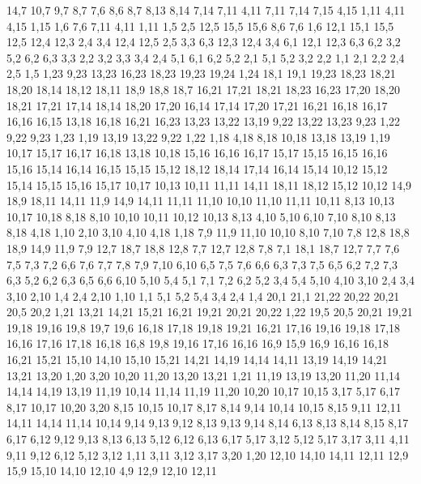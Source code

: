 14,7
10,7
9,7
8,7
%
7,6
8,6
8,7
8,13
8,14
7,14
7,11
%
4,11
7,11
7,14
7,15
4,15
%
1,11
4,11
4,15
1,15
%
1,6
7,6
7,11
4,11
1,11
%
1,5
2,5
12,5
15,5
15,6
8,6
7,6
1,6
%
12,1
15,1
15,5
12,5
12,4
12,3
%
2,4
3,4
12,4
12,5
2,5
%
3,3
6,3
12,3
12,4
3,4
%
6,1
12,1
12,3
6,3
6,2
%
3,2
5,2
6,2
6,3
3,3
%
2,2
3,2
3,3
3,4
2,4
%
5,1
6,1
6,2
5,2
%
2,1
5,1
5,2
3,2
2,2
%
1,1
2,1
2,2
2,4
2,5
1,5
1,23
9,23
13,23
16,23
18,23
19,23
19,24
1,24
%
18,1
19,1
19,23
18,23
18,21
18,20
18,14
18,12
18,11
18,9
18,8
18,7
%
16,21
17,21
18,21
18,23
16,23
%
17,20
18,20
18,21
17,21
%
17,14
18,14
18,20
17,20
%
16,14
17,14
17,20
17,21
16,21
16,18
16,17
16,16
16,15
%
13,18
16,18
16,21
16,23
13,23
13,22
13,19
%
9,22
13,22
13,23
9,23
%
1,22
9,22
9,23
1,23
%
1,19
13,19
13,22
9,22
1,22
%
1,18
4,18
8,18
10,18
13,18
13,19
1,19
%
10,17
15,17
16,17
16,18
13,18
10,18
%
15,16
16,16
16,17
15,17
%
15,15
16,15
16,16
15,16
%
15,14
16,14
16,15
15,15
%
15,12
18,12
18,14
17,14
16,14
15,14
%
10,12
15,12
15,14
15,15
15,16
15,17
10,17
10,13
%
10,11
11,11
14,11
18,11
18,12
15,12
10,12
%
14,9
18,9
18,11
14,11
%
11,9
14,9
14,11
11,11
11,10
%
10,10
11,10
11,11
10,11
%
8,13
10,13
10,17
10,18
8,18
%
8,10
10,10
10,11
10,12
10,13
8,13
%
4,10
5,10
6,10
7,10
8,10
8,13
8,18
4,18
%
1,10
2,10
3,10
4,10
4,18
1,18
%
7,9
11,9
11,10
10,10
8,10
7,10
%
7,8
12,8
18,8
18,9
14,9
11,9
7,9
%
12,7
18,7
18,8
12,8
%
7,7
12,7
12,8
7,8
%
7,1
18,1
18,7
12,7
7,7
7,6
7,5
7,3
7,2
%
6,6
7,6
7,7
7,8
7,9
7,10
6,10
%
6,5
7,5
7,6
6,6
%
6,3
7,3
7,5
6,5
%
6,2
7,2
7,3
6,3
%
5,2
6,2
6,3
6,5
6,6
6,10
5,10
5,4
%
5,1
7,1
7,2
6,2
5,2
%
3,4
5,4
5,10
4,10
3,10
%
2,4
3,4
3,10
2,10
%
1,4
2,4
2,10
1,10
%
1,1
5,1
5,2
5,4
3,4
2,4
1,4
20,1
21,1
21,22
20,22
20,21
20,5
20,2
%
1,21
13,21
14,21
15,21
16,21
19,21
20,21
20,22
1,22
%
19,5
20,5
20,21
19,21
19,18
19,16
19,8
19,7
19,6
%
16,18
17,18
19,18
19,21
16,21
%
17,16
19,16
19,18
17,18
%
16,16
17,16
17,18
16,18
%
16,8
19,8
19,16
17,16
16,16
16,9
%
15,9
16,9
16,16
16,18
16,21
15,21
15,10
%
14,10
15,10
15,21
14,21
14,19
14,14
14,11
%
13,19
14,19
14,21
13,21
13,20
%
1,20
3,20
10,20
11,20
13,20
13,21
1,21
%
11,19
13,19
13,20
11,20
%
11,14
14,14
14,19
13,19
11,19
%
10,14
11,14
11,19
11,20
10,20
10,17
10,15
%
3,17
5,17
6,17
8,17
10,17
10,20
3,20
%
8,15
10,15
10,17
8,17
%
8,14
9,14
10,14
10,15
8,15
%
9,11
12,11
14,11
14,14
11,14
10,14
9,14
9,13
9,12
%
8,13
9,13
9,14
8,14
%
6,13
8,13
8,14
8,15
8,17
6,17
%
6,12
9,12
9,13
8,13
6,13
%
5,12
6,12
6,13
6,17
5,17
%
3,12
5,12
5,17
3,17
%
3,11
4,11
9,11
9,12
6,12
5,12
3,12
%
1,11
3,11
3,12
3,17
3,20
1,20
%
12,10
14,10
14,11
12,11
%
12,9
15,9
15,10
14,10
12,10
%
4,9
12,9
12,10
12,11
